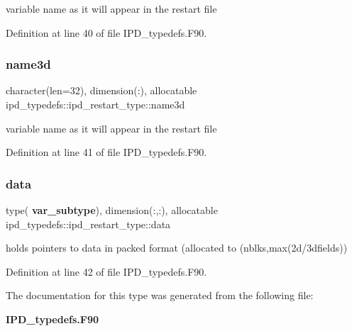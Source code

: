 variable name as it will appear in the restart file 



Definition at line 40 of file I\+P\+D\+\_\+typedefs.\+F90.

\mbox{\label{structipd__typedefs_1_1ipd__restart__type_a7fefeb18b03b4e6d405c382b26f09dc2}} 
\subsubsection{name3d}
{\footnotesize\ttfamily character(len=32), dimension(\+:), allocatable ipd\+\_\+typedefs\+::ipd\+\_\+restart\+\_\+type\+::name3d}



variable name as it will appear in the restart file 



Definition at line 41 of file I\+P\+D\+\_\+typedefs.\+F90.

\mbox{\label{structipd__typedefs_1_1ipd__restart__type_a078018c4127e064716fe1117a8a7afa7}} 
\subsubsection{data}
{\footnotesize\ttfamily type(\textbf{ var\+\_\+subtype}), dimension(\+:,\+:), allocatable ipd\+\_\+typedefs\+::ipd\+\_\+restart\+\_\+type\+::data}



holds pointers to data in packed format (allocated to (nblks,max(2d/3dfields)) 



Definition at line 42 of file I\+P\+D\+\_\+typedefs.\+F90.



The documentation for this type was generated from the following file\+:\begin{DoxyCompactItemize}
\item 
\textbf{ I\+P\+D\+\_\+typedefs.\+F90}\end{DoxyCompactItemize}
